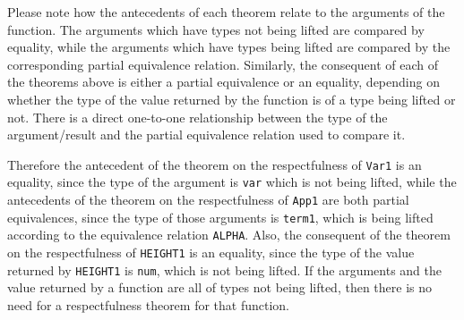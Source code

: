 \documentclass[envcountsame,runningheads]{llncs}
\newcommand{\quotient}{partial equivalence}
\begin{document}
%
% 


Please note how the antecedents of each theorem relate to the arguments
of the function.  The arguments which have types not being lifted
are compared by equality, while the arguments which have types being lifted
are compared by the corresponding \quotient{} relation.  Similarly, the
consequent of each of the theorems above is either a \quotient{} or an
equality, depending on whether the type of the value returned by the
function is of a type being lifted or not.  There is a direct one-to-one
relationship between the type of the argument/result and the 
\quotient{} relation used to compare it.

Therefore the antecedent of the theorem on the respectfulness of {\tt Var1}
is an equality, since the type of the argument is {\tt var} which is not
being lifted, while the antecedents of the theorem on the respectfulness
of {\tt App1} are both \quotient{}s, since the type of those arguments is
{\tt term1}, which is being lifted according to the equivalence relation
{\tt ALPHA}.  Also, the consequent of the theorem on the respectfulness
of {\tt HEIGHT1} is an equality, since the type of the value returned
by {\tt HEIGHT1} is {\tt num}, which is not being lifted.  If the
arguments and the value returned by a function are all of types
not being lifted, then there is no need for a respectfulness theorem
for that function.
\end{document}
